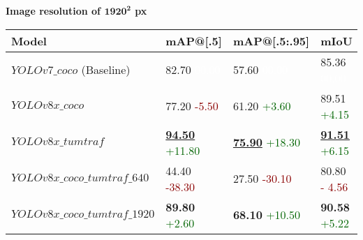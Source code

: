 \begin{table}[htb]%
	\centering%
	
	\begin{minipage}{\textwidth}
		\centering
		\textbf{Image resolution of $\bm{1920^2}$ px} \\
		\begin{tabular}{llll}
			\toprule
			\textbf{Model} & \textbf{mAP@[.5]} & \textbf{mAP@[.5:.95]} & \textbf{mIoU} \\
			\midrule
			$YOLOv7\_coco$ (Baseline) & 82.70 \scriptsize\textcolor{white}{ 00.00} & 57.60 \scriptsize\textcolor{white}{ 00.00} & 85.36 \scriptsize\textcolor{white}{ 00.00} \\
			$YOLOv8x\_coco$ & 77.20   \scriptsize\textcolor{darkred}{-5.50} & 61.20 \scriptsize\textcolor{darkgreen}{ +3.60} & 89.51 \scriptsize\textcolor{darkgreen}{ +4.15} \\
			$YOLOv8x\_tumtraf$ & \textbf{\underline{94.50}} \scriptsize\textcolor{darkgreen}{+11.80} & \textbf{\underline{75.90}} \scriptsize\textcolor{darkgreen}{+18.30} & \textbf{\underline{91.51}} \scriptsize\textcolor{darkgreen}{+6.15} \\
			$YOLOv8x\_coco\_tumtraf\_640$ & 44.40  \scriptsize\textcolor{darkred}{-38.30} & 27.50  \scriptsize\textcolor{darkred}{-30.10} & 80.80   \scriptsize\textcolor{darkred}{- 4.56} \\
			$YOLOv8x\_coco\_tumtraf\_1920$ & \textbf{89.80} \scriptsize\textcolor{darkgreen}{ +2.60} & \textbf{68.10} \scriptsize\textcolor{darkgreen}{+10.50} & \textbf{90.58} \scriptsize\textcolor{darkgreen}{ +5.22} \\
			\bottomrule
		\end{tabular}
	\end{minipage}
	
	\vspace{2em} %
	

\end{table}
